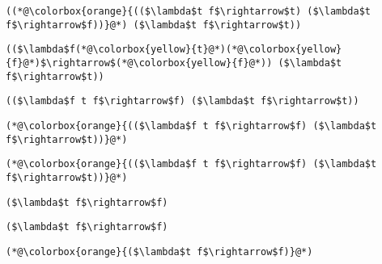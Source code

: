 \documentclass{beamer}
\begin{document}
\begin{frame}[fragile]{\CurrentSection}
\lstset{basicstyle=\ttfamily\small}\lstset{numbers=none}\lstset{language=ML}\begin{lstlisting}
((*@\colorbox{orange}{(($\lambda$t f$\rightarrow$t) ($\lambda$t f$\rightarrow$f))}@*) ($\lambda$t f$\rightarrow$t))
\end{lstlisting}
\pause\lstset{language=ML}\begin{lstlisting}
(($\lambda$f(*@\colorbox{yellow}{t}@*)(*@\colorbox{yellow}{f}@*)$\rightarrow$(*@\colorbox{yellow}{f}@*)) ($\lambda$t f$\rightarrow$t))
\end{lstlisting}

\end{frame}

\begin{frame}[fragile]{\CurrentSection}
\lstset{basicstyle=\ttfamily\small}\lstset{numbers=none}\lstset{language=ML}\begin{lstlisting}
(($\lambda$f t f$\rightarrow$f) ($\lambda$t f$\rightarrow$t))
\end{lstlisting}
\pause\lstset{language=ML}\begin{lstlisting}
(*@\colorbox{orange}{(($\lambda$f t f$\rightarrow$f) ($\lambda$t f$\rightarrow$t))}@*)
\end{lstlisting}

\end{frame}

\begin{frame}[fragile]{\CurrentSection}
\lstset{basicstyle=\ttfamily\small}\lstset{numbers=none}\lstset{language=ML}\begin{lstlisting}
(*@\colorbox{orange}{(($\lambda$f t f$\rightarrow$f) ($\lambda$t f$\rightarrow$t))}@*)
\end{lstlisting}
\pause\lstset{language=ML}\begin{lstlisting}
($\lambda$t f$\rightarrow$f)
\end{lstlisting}

\end{frame}

\begin{frame}[fragile]{\CurrentSection}
\lstset{basicstyle=\ttfamily\small}\lstset{numbers=none}\lstset{language=ML}\begin{lstlisting}
($\lambda$t f$\rightarrow$f)
\end{lstlisting}
\pause\lstset{language=ML}\begin{lstlisting}
(*@\colorbox{orange}{($\lambda$t f$\rightarrow$f)}@*)
\end{lstlisting}

\end{frame}
\end{document}
